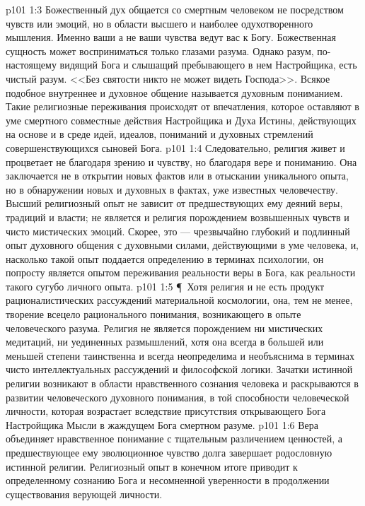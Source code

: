 \vs p101 1:3 Божественный дух общается со смертным человеком не посредством чувств или эмоций, но в области высшего и наиболее одухотворенного мышления. Именно ваши  а не ваши чувства ведут вас к Богу. Божественная сущность может восприниматься только глазами разума. Однако разум, по\hyp{}настоящему видящий Бога и слышащий пребывающего в нем Настройщика, есть чистый разум. <<Без святости никто не может видеть Господа>>. Всякое подобное внутреннее и духовное общение называется духовным пониманием. Такие религиозные переживания происходят от впечатления, которое оставляют в уме смертного совместные действия Настройщика и Духа Истины, действующих на основе и в среде идей, идеалов, пониманий и духовных стремлений совершенствующихся сыновей Бога.
\vs p101 1:4 Следовательно, религия живет и процветает не благодаря зрению и чувству, но благодаря вере и пониманию. Она заключается не в открытии новых фактов или в отыскании уникального опыта, но в обнаружении новых и духовных  в фактах, уже известных человечеству. Высший религиозный опыт не зависит от предшествующих ему деяний веры, традиций и власти; не является и религия порождением возвышенных чувств и чисто мистических эмоций. Скорее, это --- чрезвычайно глубокий и подлинный опыт духовного общения с духовными силами, действующими в уме человека, и, насколько такой опыт поддается определению в терминах психологии, он попросту является опытом переживания реальности веры в Бога, как реальности такого сугубо личного опыта.
\vs p101 1:5 \P\ Хотя религия и не есть продукт рационалистических рассуждений материальной космологии, она, тем не менее, творение всецело рационального понимания, возникающего в опыте человеческого разума. Религия не является порождением ни мистических медитаций, ни уединенных размышлений, хотя она всегда в большей или меньшей степени таинственна и всегда неопределима и необъяснима в терминах чисто интеллектуальных рассуждений и философской логики. Зачатки истинной религии возникают в области нравственного сознания человека и раскрываются в развитии человеческого духовного понимания, в той способности человеческой личности, которая возрастает вследствие присутствия открывающего Бога Настройщика Мысли в жаждущем Бога смертном разуме.
\vs p101 1:6 Вера объединяет нравственное понимание с тщательным различением ценностей, а предшествующее ему эволюционное чувство долга завершает родословную истинной религии. Религиозный опыт в конечном итоге приводит к определенному сознанию Бога и несомненной уверенности в продолжении существования верующей личности.
